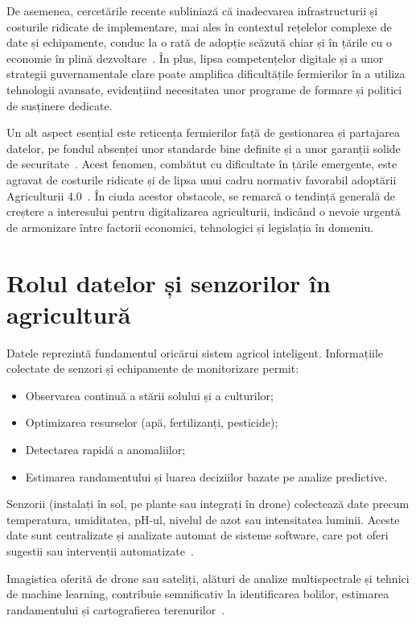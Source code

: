 \documentclass[runningheads,a4paper,11pt,twoside]{report}
\begin{document}
De asemenea, cercetările recente subliniază că inadecvarea infrastructurii și costurile ridicate de implementare, mai ales în contextul rețelelor complexe de date și echipamente, conduc la o rată de adopție scăzută chiar și în țările cu o economie în plină dezvoltare~\cite{ahmed2024_smart_agriculture}. În plus, lipsa competențelor digitale și a unor strategii guvernamentale clare poate amplifica dificultățile fermierilor în a utiliza tehnologii avansate, evidențiind necesitatea unor programe de formare și politici de susținere dedicate.

Un alt aspect esențial este reticența fermierilor față de gestionarea și partajarea datelor, pe fondul absenței unor standarde bine definite și a unor garanții solide de securitate~\cite{talero2023_smartfarming_barriers}. Acest fenomen, combătut cu dificultate în țările emergente, este agravat de costurile ridicate și de lipsa unui cadru normativ favorabil adoptării Agriculturii 4.0~\cite{islam2023_agriculture4_emerging}. În ciuda acestor obstacole, se remarcă o tendință generală de creștere a interesului pentru digitalizarea agriculturii, indicând o nevoie urgentă de armonizare între factorii economici, tehnologici și legislația în domeniu.

\section{Rolul datelor și senzorilor în agricultură}
Datele reprezintă fundamentul oricărui sistem agricol inteligent. Informațiile colectate de senzori și echipamente de monitorizare permit:

\begin{itemize}
  \item Observarea continuă a stării solului și a culturilor;
  \item Optimizarea resurselor (apă, fertilizanți, pesticide);
  \item Detectarea rapidă a anomaliilor;
  \item Estimarea randamentului și luarea deciziilor bazate pe analize predictive.
\end{itemize}

Senzorii (instalați în sol, pe plante sau integrați în drone) colectează date precum temperatura, umiditatea, pH-ul, nivelul de azot sau intensitatea luminii. Aceste date sunt centralizate și analizate automat de sisteme software, care pot oferi sugestii sau intervenții automatizate~\cite{liakos2018machine}.

Imagistica oferită de drone sau sateliți, alături de analize multispectrale și tehnici de machine learning, contribuie semnificativ la identificarea bolilor, estimarea randamentului și cartografierea terenurilor~\cite{zhang2002precision}.
\end{document}
